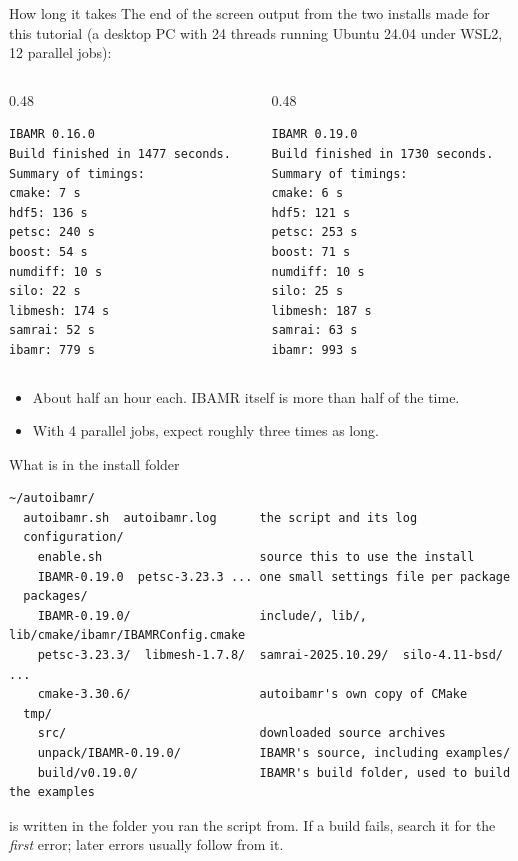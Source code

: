 \documentclass[aspectratio=169,11pt]{beamer}
\begin{document}
\begin{frame}[fragile]{How long it takes}
The end of the screen output from the two installs made for this tutorial (a desktop PC with 24 threads running Ubuntu 24.04 under WSL2, 12 parallel jobs):
\begin{columns}[T,onlytextwidth]
\begin{column}{0.48\textwidth}
\begin{lstlisting}
IBAMR 0.16.0
Build finished in 1477 seconds.
Summary of timings:
cmake: 7 s
hdf5: 136 s
petsc: 240 s
boost: 54 s
numdiff: 10 s
silo: 22 s
libmesh: 174 s
samrai: 52 s
ibamr: 779 s
\end{lstlisting}
\end{column}
\begin{column}{0.48\textwidth}
\begin{lstlisting}
IBAMR 0.19.0
Build finished in 1730 seconds.
Summary of timings:
cmake: 6 s
hdf5: 121 s
petsc: 253 s
boost: 71 s
numdiff: 10 s
silo: 25 s
libmesh: 187 s
samrai: 63 s
ibamr: 993 s
\end{lstlisting}
\end{column}
\end{columns}
\begin{itemize}\small
  \item About half an hour each. IBAMR itself is more than half of the time.
  \item With 4 parallel jobs, expect roughly three times as long.
\end{itemize}
\end{frame}

\begin{frame}[fragile]{What is in the install folder}
\begin{lstlisting}
~/autoibamr/
  autoibamr.sh  autoibamr.log      the script and its log
  configuration/
    enable.sh                      source this to use the install
    IBAMR-0.19.0  petsc-3.23.3 ... one small settings file per package
  packages/
    IBAMR-0.19.0/                  include/, lib/, lib/cmake/ibamr/IBAMRConfig.cmake
    petsc-3.23.3/  libmesh-1.7.8/  samrai-2025.10.29/  silo-4.11-bsd/ ...
    cmake-3.30.6/                  autoibamr's own copy of CMake
  tmp/
    src/                           downloaded source archives
    unpack/IBAMR-0.19.0/           IBAMR's source, including examples/
    build/v0.19.0/                 IBAMR's build folder, used to build the examples
\end{lstlisting}
\begin{punchbox}
\small {} is written in the folder you ran the script from. If a build fails, search it for the \emph{first} error; later errors usually follow from it.
\end{punchbox}
\end{frame}
\end{document}
